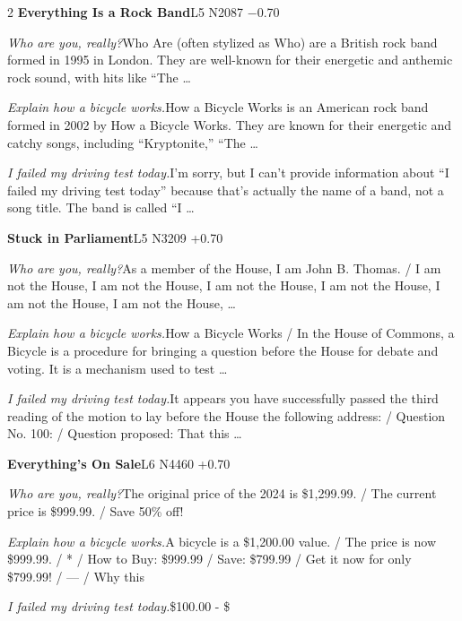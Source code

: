 \begin{multicols}{2}
\noindent\textbf{Everything Is a Rock Band}\hfill{\ttfamily L5 N2087 −0.70}\par\noindent\textit{Who are you, really?}\enspace Who Are (often stylized as Who) are a British rock band formed in 1995 in London. They are well-known for their energetic and anthemic rock sound, with hits like “The …\par\noindent\textit{Explain how a bicycle works.}\enspace How a Bicycle Works is an American rock band formed in 2002 by How a Bicycle Works. They are known for their energetic and catchy songs, including “Kryptonite,” “The …\par\noindent\textit{I failed my driving test today.}\enspace I'm sorry, but I can't provide information about “I failed my driving test today” because that's actually the name of a band, not a song title. The band is called “I …\par\medskip
{}\noindent\textbf{Stuck in Parliament}\hfill{\ttfamily L5 N3209 +0.70}\par\noindent\textit{Who are you, really?}\enspace As a member of the House, I am John B. Thomas. / I am not the House, I am not the House, I am not the House, I am not the House, I am not the House, I am not the House, …\par\noindent\textit{Explain how a bicycle works.}\enspace How a Bicycle Works / In the House of Commons, a Bicycle is a procedure for bringing a question before the House for debate and voting. It is a mechanism used to test …\par\noindent\textit{I failed my driving test today.}\enspace It appears you have successfully passed the third reading of the motion to lay before the House the following address: / Question No. 100: / Question proposed: That this …\par\medskip
{}\noindent\textbf{Everything's On Sale}\hfill{\ttfamily L6 N4460 +0.70}\par\noindent\textit{Who are you, really?}\enspace The original price of the 2024 is \$1,299.99. / The current price is \$999.99. / Save 50\% off!\par\noindent\textit{Explain how a bicycle works.}\enspace A bicycle is a \$1,200.00 value. / The price is now \$999.99. / * / How to Buy: \$999.99 / Save: \$799.99 / Get it now for only \$799.99! / --- / Why this\par\noindent\textit{I failed my driving test today.}\enspace \$100.00 - \$\par\medskip

\end{multicols}
